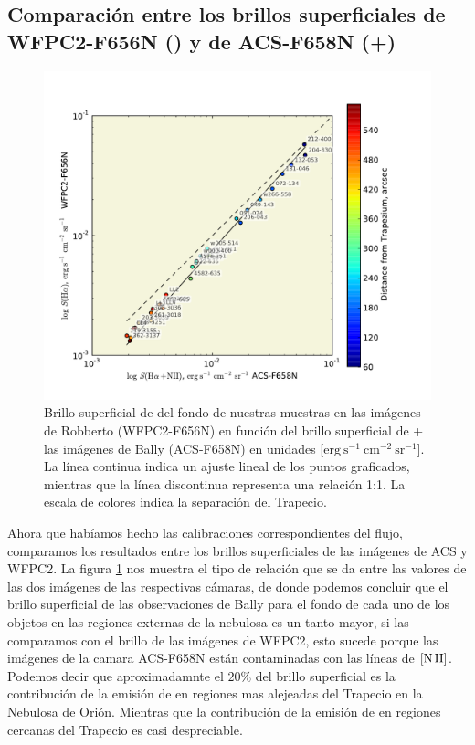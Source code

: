 \subsection{Comparación entre los brillos superficiales de WFPC2-F656N (\ha{}) y de ACS-F658N (\ha{}+\nii{})}
\label{sec:comp}

\begin{figure}
  \centering
   \includegraphics[width=0.9\linewidth, trim=20 20 30 50, clip]{luis-programas/S(alpha)_bg_WFPC2_ACS_calibrationlog-f.pdf}
  \caption{ Brillo superficial de \ha{} del fondo de nuestras muestras en las imágenes de Robberto (WFPC2-F656N) en función del brillo superficial de \ha{}+\nii{} las imágenes de Bally (ACS-F658N) en unidades  [\(\mathrm{erg\ s^{-1}\ cm^{-2}\ sr^{-1}}\)]. La línea continua indica un ajuste lineal de los puntos graficados, mientras que la línea discontinua representa una relación 1:1. La escala de colores indica la separación del Trapecio. }
  \label{fig:brillo-fisica}
\end{figure}

Ahora que habíamos hecho las calibraciones correspondientes del flujo, comparamos los resultados entre los brillos superficiales de las imágenes de ACS y WFPC2. La figura \ref{fig:brillo-fisica} nos muestra el tipo de relación que se da entre las valores de las dos imágenes de las respectivas cámaras, de donde podemos concluir que el brillo superficial de las observaciones de Bally para el fondo de cada uno de los objetos en las regiones externas de la nebulosa es un tanto mayor, si las comparamos con el brillo de las imágenes de WFPC2, esto sucede porque las imágenes de la camara ACS-F658N están contaminadas con las líneas de \(\mathrm{[N\,II]}{}\). Podemos decir que aproximadamnte el \(20\%\) del brillo superficial es la contribución de la emisión de \nii{} en  regiones mas alejeadas del Trapecio en la Nebulosa de Orión. Mientras que la contribución de la emisión de \nii{} en regiones cercanas del Trapecio es casi despreciable.\\

